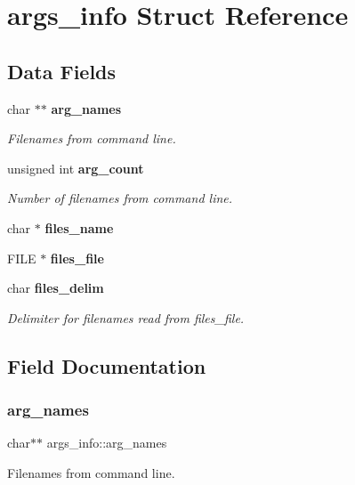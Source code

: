 \section{args\+\_\+info Struct Reference}
\label{structargs__info}
\subsection*{Data Fields}
\begin{DoxyCompactItemize}
\item 
char $\ast$$\ast$ \textbf{ arg\+\_\+names}
\begin{DoxyCompactList}\small\item\em Filenames from command line. \end{DoxyCompactList}\item 
unsigned int \textbf{ arg\+\_\+count}
\begin{DoxyCompactList}\small\item\em Number of filenames from command line. \end{DoxyCompactList}\item 
char $\ast$ \textbf{ files\+\_\+name}
\item 
F\+I\+LE $\ast$ \textbf{ files\+\_\+file}
\item 
char \textbf{ files\+\_\+delim}
\begin{DoxyCompactList}\small\item\em Delimiter for filenames read from files\+\_\+file. \end{DoxyCompactList}\end{DoxyCompactItemize}


\subsection{Field Documentation}
\mbox{\label{structargs__info_a9d647873446a849c7c06def495195a35}} 
\subsubsection{arg\+\_\+names}
{\footnotesize\ttfamily char$\ast$$\ast$ args\+\_\+info\+::arg\+\_\+names}



Filenames from command line. 

\mbox{\label{structargs__info_ac368e3df3d1584d8d3de1fdb8a3dc751}} 
